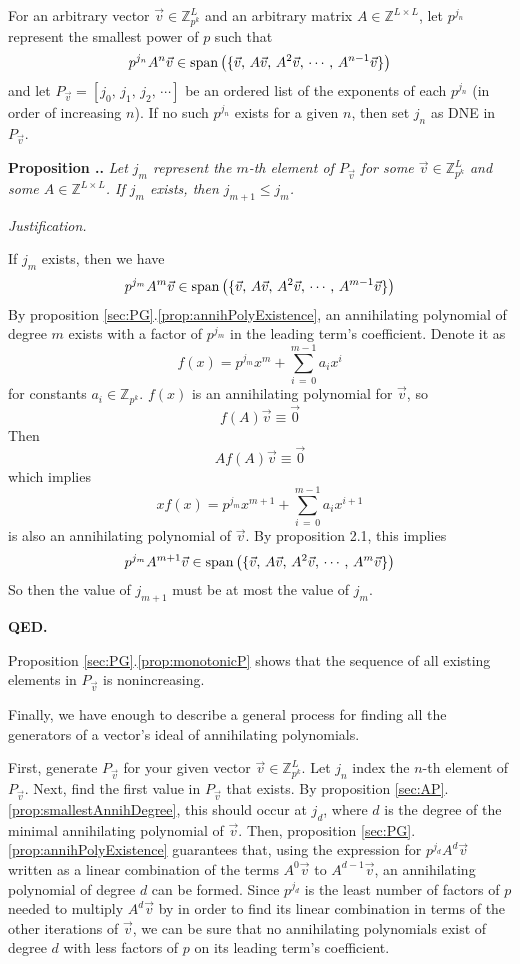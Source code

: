 \documentclass[a4paper, reqno, 12pt]{amsart}
\newcommand\vecspan[1]{\textup{span}\left(#1\right)}
\newcounter{propcounter}[section]
\newenvironment{proposition}[1]
{
	\refstepcounter{propcounter}
	\textbf{Proposition \thesection.\thepropcounter.} \emph{#1}
	
	\emph{Justification.}
}
{
	\textbf{QED.} \\
}
\begin{document}
		For an arbitrary vector $\vec{v} \in \mathds{Z}_{p^k}^{L}$ and an arbitrary matrix $A \in \mathds{Z}^{L \times L}$, let $p^{j_n}$ represent the smallest power of $p$
		such that 
		\[
			p^{j_n}A^n\vec{v} \in \vecspan{\{\vec{v},\, A\vec{v},\, A^2\vec{v},\, \cdots,\, A^{n-1}\vec{v}\}}
		\]
		and let $P_{\vec{v}} = [j_0,\, j_1,\, j_2,\, \cdots]$ be an ordered list of the exponents of each $p^{j_n}$ (in order of increasing $n$). If no such $p^{j_n}$ exists 
		for a given $n$, then set $j_n$ as DNE in $P_{\vec{v}}$.
		
		\begin{proposition}{Let $j_m$ represent the $m$-th element of $P_{\vec{v}}$ for some $\vec{v} \in \mathds{Z}_{p^k}^L$ and some $A \in \mathds{Z}^{L \times L}$. 
		If $j_m$ exists, then $j_{m+1} \leq j_m$.}
			\label{prop:monotonicP}
			If $j_m$ exists, then we have
			\[
				p^{j_m}A^m\vec{v} \in \vecspan{\{\vec{v},\, A\vec{v},\, A^2\vec{v},\, \cdots,\, A^{m-1}\vec{v}\}}
			\]
			By proposition \ref{sec:PG}.\ref{prop:annihPolyExistence}, an annihilating polynomial of degree $m$ exists with a factor of $p^{j_m}$ in the leading term's 
			coefficient. Denote it as
			\[
				f(x) = p^{j_m}x^m + \sum_{i\,=\,0}^{m-1} a_ix^i
			\]
			for constants $a_i \in \mathds{Z}_{p^k}$. $f(x)$ is an annihilating polynomial for $\vec{v}$, so
			\[
				f(A)\vec{v} \equiv \vec{0}
			\]
			Then
			\[
				Af(A)\vec{v} \equiv \vec{0}
			\]
			which implies
			\[
				xf(x) = p^{j_m}x^{m+1} + \sum_{i\,=\,0}^{m-1} a_ix^{i+1}
			\]
			is also an annihilating polynomial of $\vec{v}$. By proposition 2.1, this implies
			\[
				p^{j_m}A^{m+1}\vec{v} \in \vecspan{\{\vec{v},\, A\vec{v},\, A^2\vec{v},\, \cdots,\, A^m\vec{v}\}}
			\]
			So then the value of $j_{m+1}$ must be at most the value of $j_m$.
		\end{proposition}
		
		Proposition \ref{sec:PG}.\ref{prop:monotonicP} shows that the sequence of all existing elements in $P_{\vec{v}}$ is nonincreasing. 
		
		Finally, we have enough to describe a general process for finding all the generators of a vector's ideal of annihilating polynomials.
		
		First, generate $P_{\vec{v}}$ for your given vector $\vec{v} \in \mathds{Z}_{p^k}^L$. Let $j_n$ index the $n$-th element of $P_{\vec{v}}$. Next, find the first 
		value in $P_{\vec{v}}$ that exists. By proposition \ref{sec:AP}.\ref{prop:smallestAnnihDegree}, this should occur at $j_d$, where $d$ is the degree of the minimal 
		annihilating polynomial of $\vec{v}$. Then, proposition \ref{sec:PG}.\ref{prop:annihPolyExistence} guarantees that, using the expression for $p^{j_d}A^d\vec{v}$ 
		written as a linear combination of the terms $A^0\vec{v}$ to $A^{d-1}\vec{v}$, an annihilating polynomial of degree $d$ can be formed. Since $p^{j_d}$ is the least 
		number of factors of $p$ needed to multiply $A^d\vec{v}$ by in order to find its linear combination in terms of the other iterations of $\vec{v}$, we can be sure 
		that no annihilating polynomials exist of degree $d$ with less factors of $p$ on its leading term's coefficient.
		
\end{document}
